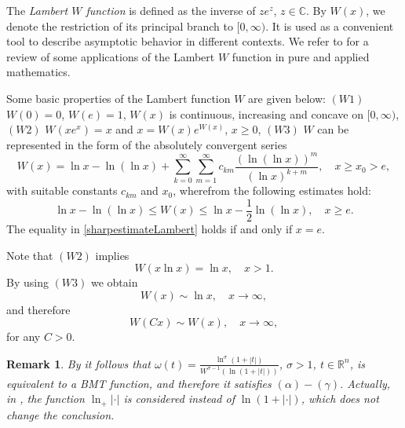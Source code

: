 \documentclass{article}
\theoremstyle{thmstyleone}
\theoremstyle{thmstyletwo}%
\newtheorem{Remark}[Theorem]{Remark}%
\theoremstyle{thmstylethree}%
\begin{document}
The \emph{Lambert $W$ function} is defined as the inverse of $z e^{z}$, $z\in {\mathbb C}$. By $W(x)$, we denote the restriction of its principal branch to $[0,\infty)$. It is used as a convenient tool to describe asymptotic behavior in different contexts. We refer to \cite{LambF,Mezo} for a review of some applications of the Lambert $W$ function in pure and applied mathematics. 


Some basic properties of the Lambert function $W$ are given below:
\newline
$(W1)$ \hspace{1em} $W(0)=0$, $W(e)=1$, $W(x)$ is continuous, increasing and concave on $[0,\infty)$,
\newline
$(W2)$ \hspace{1em} $W(x e^{x})=x$ and $ x=W(x)e^{W(x)}$,  $x\geq 0$,
\newline
$(W3)$ \hspace{1em} $W$ can be represented in the form of the absolutely convergent series
\begin{equation*}
W(x)=\ln x-\ln (\ln x)+\sum_{k=0}^{\infty}\sum_{m=1}^{\infty}c_{km}\frac{(\ln(\ln x))^m}{(\ln x)^{k+m}},\quad x\geq x_0>e,
\end{equation*}
with suitable constants $c_{km}$ and  $x_0 $, wherefrom  the following  estimates hold:
\begin{equation}
\label{sharpestimateLambert}
\ln x -\ln(\ln x)\leq W(x)\leq \ln x-\frac{1}{2}\ln (\ln x), \quad x\geq e.
\end{equation}
The equality in \eqref{sharpestimateLambert} holds if and only if $x=e$.

Note that $(W2)$ implies
\begin{equation*}
\label{PosledicaLambert1}
W(x\ln x)=\ln x,\quad x>1.
\end{equation*}
By using $(W3)$ we obtain
\begin{equation*}
\label{PosledicaLambert1.5}
W(x)\sim \ln x, \quad x\to \infty,
\end{equation*}
and therefore
\begin{equation*}
\label{PosledicaLambert2}
W(C x)\sim W(x),\quad x\to \infty,
\end{equation*}
for any $C>0$.




\begin{Remark}
\label{RemarkBMT}
By \cite[Theorem 1]{TT0} it follows that 
$\displaystyle 
\omega(t)=\frac{\ln^{\sigma}(1+|t|)}{W^{\sigma-1}(\ln(1+|t|))}
$, $\sigma>1$, $t\in \mathbb R^n$, 
is equivalent to a BMT function, and therefore it satisfies $(\alpha)-(\gamma)$. 
Actually, in \cite{TT0}, the function $\ln_+|\cdot|$ is considered instead of  $\ln(1+|\cdot|)$, which does not change the conclusion.
\end{Remark} 
\end{document}
